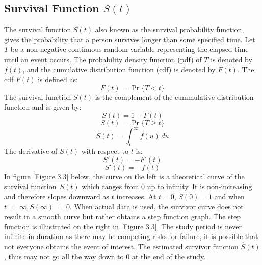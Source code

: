 \documentclass[doublespacing]{report} [12px]%
\begin{document}
\subsection{\texorpdfstring{Survival Function \( S(t) \)}{Survival Function S(t)}}
The survival function \(S\left(t\right) \) also known as the survival probability function, gives the probability that a person survives longer than some specified time.  Let \(T\) be a non-negative continuous random variable representing the elapsed time until an event occurs. The probability density function (pdf) of \(T\) is denoted by \(f(t)\), and the cumulative distribution function (cdf) is denoted by \(F(t)\). The cdf \(F(t)\) is defined as:
\begin{equation}
F(t) = \Pr\{T < t\}
\end{equation}
The survival function \(S(t)\) is the complement of the cummulative distribution function and is given by:
\begin{equation}
S(t) = 1 - F(t)
\end{equation}
\begin{equation}
S(t) = \Pr\{T \geq t\}
\end{equation}
\begin{equation}
S(t) = \int_t^\infty f(u) \, du
\end{equation}
The derivative of \(S(t)\) with respect to \(t\) is:
\begin{equation}
S'(t) = -F'(t)
\end{equation}
\begin{equation}
S'(t) = -f(t)
\end{equation}
In figure \ref{Figure 3.3} below, the curve on the left is a theoretical curve of the survival function\ \(S\left(t\right) \) which ranges from 0 up to infinity. It is non-increasing and therefore slopes downward as \(t\) increases. At \(t= 0\), \(S\left(0\right)=1\) and when \( t\ =\ \infty , S\left(\infty\right)\ =\ 0.\) 
When actual data is used, the survivor curve does not result in a smooth curve but rather obtains a step function graph. The step function is illustrated on the right in \ref{Figure 3.3}.  The study period is never infinite in duration as there may be competing risks for failure, it is possible that not everyone obtains the event of interest. The estimated survivor function \(\hat{S}\left(t\right)\), thus may not go all the way down to 0 at the end of the study.
\end{document}
